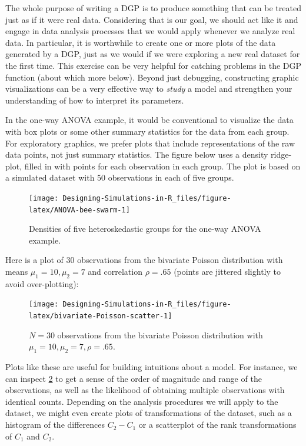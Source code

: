 \documentclass[
]{book}
\begin{document}
The whole purpose of writing a DGP is to produce something that can be treated just as if it were real data.
Considering that is our goal, we should act like it and engage in data analysis processes that we would apply whenever we analyze real data.
In particular, it is worthwhile to create one or more plots of the data generated by a DGP, just as we would if we were exploring a new real dataset for the first time.
This exercise can be very helpful for catching problems in the DGP function (about which more below).
Beyond just debugging, constructing graphic visualizations can be a very effective way to \emph{study} a model and strengthen your understanding of how to interpret its parameters.

In the one-way ANOVA example, it would be conventional to visualize the data with box plots or some other summary statistics for the data from each group.
For exploratory graphics, we prefer plots that include representations of the raw data points, not just summary statistics.
The figure below uses a density ridge-plot, filled in with points for each observation in each group.
The plot is based on a simulated dataset with 50 observations in each of five groups.

\begin{figure}

{\centering \texttt{[image: Designing-Simulations-in-R\_files/figure-latex/ANOVA-bee-swarm-1]} 

}

\caption{Densities of five heteroskedastic groups for the one-way ANOVA example.}\label{fig:ANOVA-bee-swarm}
\end{figure}

Here is a plot of 30 observations from the bivariate Poisson distribution with means \(\mu_1 = 10, \mu_2 = 7\) and correlation \(\rho = .65\) (points are jittered slightly to avoid over-plotting):

\begin{figure}

{\centering \texttt{[image: Designing-Simulations-in-R\_files/figure-latex/bivariate-Poisson-scatter-1]} 

}

\caption{$N = 30$ observations from the bivariate Poisson distribution with $\mu_1 = 10, \mu_2 = 7, \rho = .65$.}\label{fig:bivariate-Poisson-scatter}
\end{figure}

Plots like these are useful for building intuitions about a model. For instance, we can inspect \ref{fig:bivariate-Poisson-scatter} to get a sense of the order of magnitude and range of the observations, as well as the likelihood of obtaining multiple observations with identical counts.
Depending on the analysis procedures we will apply to the dataset, we might even create plots of transformations of the dataset, such as a histogram of the differences \(C_2 - C_1\) or a scatterplot of the rank transformations of \(C_1\) and \(C_2\).
\end{document}
